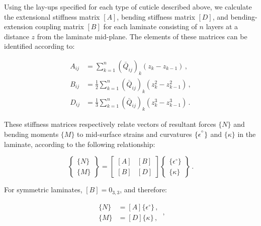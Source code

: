 \documentclass[twocolumn, linenumbers, superscriptaddress, nofootinbib]{revtex4-1}
\begin{document}
				Using the lay-ups specified for each type of cuticle described above, we calculate the extensional stiffness matrix $[A]$, bending stiffness matrix $[D]$, and bending-extension coupling matrix $[B]$ for each laminate consisting of $n$ layers at a distance $z$ from the laminate mid-plane.
				The elements of these matrices can be identified according to:
				
				\begin{equation}
					\begin{aligned}
						A_{ij} & = \sum_{k = 1}^{n}(\bar{Q}_{ij})_k(z_{k} - z_{k-1})\,, \\
						B_{ij} & = \frac{1}{2}\sum_{k = 1}^{n}(\bar{Q}_{ij})_k(z^2_{k} - z^2_{k-1})\,, \\
						D_{ij} & = \frac{1}{3}\sum_{k = 1}^{n}(\bar{Q}_{ij})_k(z^3_{k} - z^3_{k-1})\,.
					\end{aligned}
				\end{equation}
				
				These stiffness matrices respectively relate vectors of resultant forces $\{N\}$ and bending moments $\{M\}$ to mid-surface strains and curvatures $\{\epsilon^{\degree}\}$ and $\{\kappa\}$ in the laminate, according to the following relationship:
				
				\begin{equation}
					\begin{Bmatrix}
						\{N\} \\
						\{M\}
					\end{Bmatrix}
					=
					\begin{bmatrix}
						[A] & [B] \\
						[B] & [D]
					\end{bmatrix}
					\begin{Bmatrix}
					\{\epsilon^{\circ}\} \\
					\{\kappa\}
					\end{Bmatrix}\,.
				\end{equation}
				
				For symmetric laminates, $[B] = 0_{3,3}$, and therefore:
				
				\begin{equation}
				\label{eqn::abbd}
					\begin{aligned}
						\{N\} & = [A]\{\epsilon^{\circ}\}\,, \\
						\{M\} & = [D]\{\kappa\}\,,						
					\end{aligned}\,,
				\end{equation}
				
\end{document}

